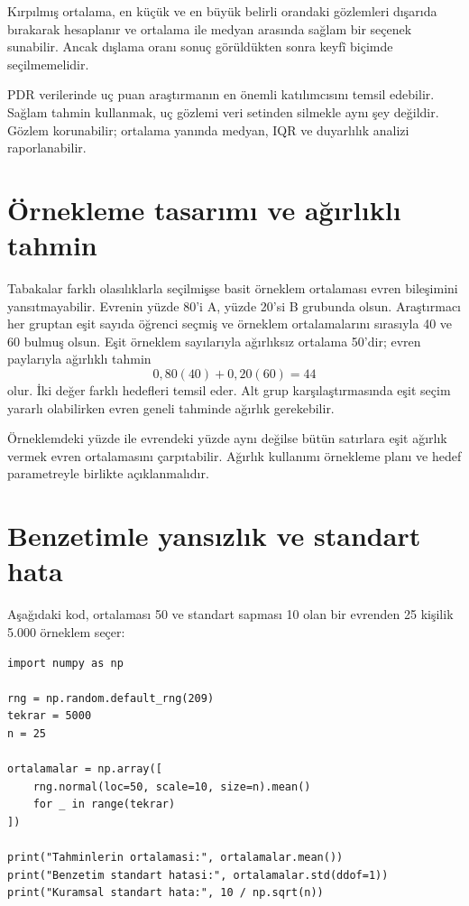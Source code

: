 Kırpılmış ortalama, en küçük ve en büyük belirli orandaki gözlemleri dışarıda
bırakarak hesaplanır ve ortalama ile medyan arasında sağlam bir seçenek
sunabilir. Ancak dışlama oranı sonuç görüldükten sonra keyfî biçimde
seçilmemelidir.

\begin{researchbox}
PDR verilerinde uç puan araştırmanın en önemli katılımcısını temsil edebilir.
Sağlam tahmin kullanmak, uç gözlemi veri setinden silmekle aynı şey değildir.
Gözlem korunabilir; ortalama yanında medyan, IQR ve duyarlılık analizi
raporlanabilir.
\end{researchbox}

\section{Örnekleme tasarımı ve ağırlıklı tahmin}

Tabakalar farklı olasılıklarla seçilmişse basit örneklem ortalaması evren
bileşimini yansıtmayabilir. Evrenin yüzde 80'i A, yüzde 20'si B grubunda olsun.
Araştırmacı her gruptan eşit sayıda öğrenci seçmiş ve örneklem ortalamalarını
sırasıyla 40 ve 60 bulmuş olsun. Eşit örneklem sayılarıyla ağırlıksız ortalama
50'dir; evren paylarıyla ağırlıklı tahmin
\[
0{,}80(40)+0{,}20(60)=44
\]
olur. İki değer farklı hedefleri temsil eder. Alt grup karşılaştırmasında eşit
seçim yararlı olabilirken evren geneli tahminde ağırlık gerekebilir.

\begin{mistakebox}
Örneklemdeki yüzde ile evrendeki yüzde aynı değilse bütün satırlara eşit ağırlık
vermek evren ortalamasını çarpıtabilir. Ağırlık kullanımı örnekleme planı ve
hedef parametreyle birlikte açıklanmalıdır.
\end{mistakebox}

\section{Benzetimle yansızlık ve standart hata}

Aşağıdaki kod, ortalaması 50 ve standart sapması 10 olan bir evrenden 25
kişilik 5.000 örneklem seçer:

\begin{lstlisting}
import numpy as np

rng = np.random.default_rng(209)
tekrar = 5000
n = 25

ortalamalar = np.array([
    rng.normal(loc=50, scale=10, size=n).mean()
    for _ in range(tekrar)
])

print("Tahminlerin ortalamasi:", ortalamalar.mean())
print("Benzetim standart hatasi:", ortalamalar.std(ddof=1))
print("Kuramsal standart hata:", 10 / np.sqrt(n))
\end{lstlisting}

